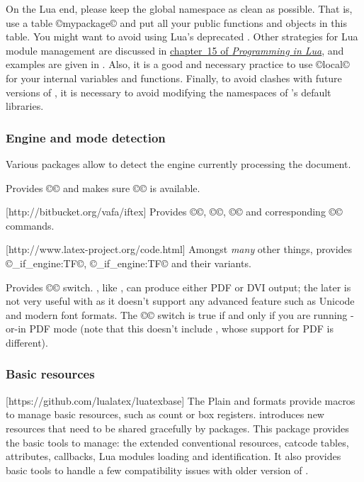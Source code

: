 \documentclass{lltxdoc}
\begin{document}
On the Lua end, please keep the global namespace as clean as possible. That
is, use a table ©mypackage© and put all your public functions and objects in
this table. You might want to avoid using Lua's deprecated .
Other strategies for Lua module management are discussed in
\href{http://www.lua.org/pil/15.html}{chapter~15 of \emph{Programming in
Lua}}, and examples are given in . Also, it
is a good and necessary practice to use ©local© for your internal variables and
functions. Finally, to avoid clashes with future versions of \luatex, it is
necessary to avoid modifying the namespaces of \luatex's default libraries.

\subsubsection{Engine and mode detection}\label{detect}

Various packages allow to detect the engine currently processing the document.

Provides ©\ifluatex© and makes sure ©\luatexversion© is available.

[http://bitbucket.org/vafa/iftex]
Provides ©\ifPDFTeX©, ©\ifXeTeX©, ©\ifLuaTeX© and corresponding ©\Require©
commands.

[http://www.latex-project.org/code.html]
Amongst \emph{many} other things, provides ©\luatex_if_engine:TF©,
©\xetex_if_engine:TF© and their variants.

Provides ©\ifpdf© switch. \luatex, like \pdftex, can produce either PDF or DVI
output; the later is not very useful with \luatex as it doesn't support any
advanced feature such as Unicode and modern font formats. The ©\ifpdf© switch
is true if and only if you are running \pdftex-or-\luatex in PDF mode (note
that this doesn't include \xetex, whose support for PDF is different).

\subsubsection{Basic resources}

[https://github.com/lualatex/luatexbase]
The Plain and \latex formats provide macros to manage \tex basic resources,
such as count or box registers. \luatex introduces new resources that need to
be shared gracefully by packages. This package provides the basic tools to
manage: the extended conventional \tex resources, catcode tables, attributes,
callbacks, Lua modules loading and identification. It also provides basic
tools to handle a few compatibility issues with older version of \luatex.
\end{document}

